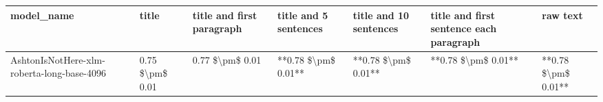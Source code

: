 \begin{tabular}{lllllll}
\toprule
                                model\_name &           title & title and first paragraph & title and 5 sentences & title and 10 sentences & title and first sentence each paragraph &            raw text \\
\midrule
AshtonIsNotHere-xlm-roberta-long-base-4096 & 0.75 \$\textbackslash pm\$ 0.01 &           0.77 \$\textbackslash pm\$ 0.01 &   **0.78 \$\textbackslash pm\$ 0.01** &    **0.78 \$\textbackslash pm\$ 0.01** &                     **0.78 \$\textbackslash pm\$ 0.01** & **0.78 \$\textbackslash pm\$ 0.01** \\
\bottomrule
\end{tabular}
